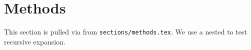 \section{Methods}
This section is pulled via \verb|| from \texttt{sections/methods.tex}.
We use a nested  to test recursive expansion.
